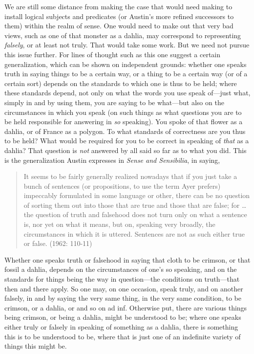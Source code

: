 We are still some distance from making the case that would need making to install logical subjects and predicates (or Austin's more refined successors to them) within the realm of sense. One would need to make out that very bad views, such as one of that monster as a dahlia, may correspond to representing \emph{falsely}, or at least not truly. That would take some work. But we need not pursue this issue further. For lines of thought such as this one suggest a certain generalization, which can be shown on independent grounds: whether one speaks truth in saying things to be a certain way, or a thing to be a certain way (or of a certain sort) depends on the standards to which one is thus to be held; where these standards depend, not only on what the words you use speak of---just what, simply in and by using them, you are saying to be what---but also on the circumstances in which you speak (on such things as what questions you are to be held responsible for answering in \emph{so} speaking). You spoke of that flower as a dahlia, or of France as a polygon. To what standards of correctness are you thus to be held? What would be required for you to be correct in speaking of \emph{that} as a dahlia? That question is \emph{not} answered by all said so far as to what you did. This is the generalization Austin expresses in \emph{Sense and Sensibilia}, in saying,
\begin{quote}
	It seems to be fairly generally realized nowadays that if you just take a bunch of sentences (or propositions, to use the term Ayer prefers) impeccably formulated in some language or other, there can be no question of sorting them out into those that are true and those that are false; for … the question of truth and falsehood does not turn only on what a sentence is, nor yet on what it means, but on, speaking very broadly, the circumstances in which it is uttered. Sentences are not as such either true or false. (1962: 110-11)
\end{quote}
Whether one speaks truth or falsehood in saying that cloth to be crimson, or that fossil a dahlia, depends on the circumstances of one's so speaking, and on the standards for things being the way in question---the conditions on truth---that then and there apply. So one may, on one occasion, speak truly, and on another falsely, in and by saying the very same thing, in the very same condition, to be crimson, or a dahlia, or and so on ad inf. Otherwise put, there are various things being crimson, or being a dahlia, might be understood to be; where one speaks either truly or falsely in speaking of something as a dahlia, there is something this is to be understood to be, where that is just one of an indefinite variety of things this might be.

